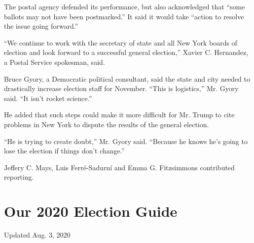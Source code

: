 The postal agency defended its performance, but also acknowledged that
``some ballots may not have been postmarked.'' It said it would take
``action to resolve the issue going forward.''

``We continue to work with the secretary of state and all New York
boards of election and look forward to a successful general election,''
Xavier C. Hernandez, a Postal Service spokesman, said.

Bruce Gyory, a Democratic political consultant, said the state and city
needed to drastically increase election staff for November. ``This is
logistics,'' Mr. Gyory said. ``It isn't rocket science.''

He added that such steps could make it more difficult for Mr. Trump to
cite problems in New York to dispute the results of the general
election.

``He is trying to create doubt,'' Mr. Gyory said. ``Because he knows
he's going to lose the election if things don't change.''

Jeffery C. Mays, Luis Ferré-Sadurní and Emma G. Fitzsimmons contributed
reporting.

\hypertarget{our-2020-election-guide}{%
\section{Our 2020 Election Guide}\label{our-2020-election-guide}}

Updated Aug. 3, 2020

